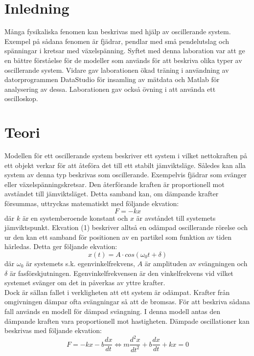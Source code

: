 \documentclass[a4paper,10pt]{article}
\begin{document}
\section{Inledning}
Många fysikaliska fenomen kan beskrivas med hjälp av oscillerande system. Exempel på sådana fenomen är fjädrar, pendlar med små pendelutslag och spänningar i kretsar med växelspänning. Syftet med denna laboration var att ge en bättre förståelse för de modeller som används för att beskriva olika typer av oscillerande system. Vidare gav laborationen ökad träning i användning av datorprogrammen DataStudio för insamling av mätdata och Matlab för analysering av dessa. Laborationen gav också övning i att använda ett oscilloskop.

\section{Teori}
 Modellen för ett oscillerande system beskriver ett system i vilket nettokraften på ett objekt verkar för att åteföra det till ett stabilt jämviktsläge. Således kan alla system av denna typ beskrivas som oscillerande. Exempelvis fjädrar som svänger eller växelspänningskretsar. Den återförande kraften är proportionell mot avståndet till jämviktsläget. Detta samband kan, om dämpande krafter försummas, uttryckas matematiskt med följande ekvation:
\begin{equation}
	F = -kx
\end{equation}
där $k$ är en systemberoende konstant och $x$ är avståndet till systemets jämviktspunkt. Ekvation (1) beskriver alltså en odämpad oscillerande rörelse och ur den kan ett samband för positionen av en partikel som funktion av tiden härledas. Detta ger följande ekvation:
\begin{equation}
	x(t) = A \cdot cos(\omega_0t + \delta)
\end{equation}
där $\omega_0$ är systemets s.k. egenvinkelfrekvens, $A$ är amplituden av svängningen och $\delta$ är fasförskjutningen. Egenvinkelfrekvensen är den vinkelfrekvens vid vilket systemet svänger om det in påverkas av yttre krafter.
\\
\indent Dock är sällan fallet i verkligheten att ett system är odämpat. Krafter från omgivningen dämpar ofta svängningar så att de bromsas. För att beskriva sådana fall används en modell för dämpad svängning. I denna modell antas den dämpande kraften vara proportionell mot hastigheten. Dämpade oscillationer kan beskrivas med följande ekvation:
\begin{equation}
	F = -kx - b\frac{dx}{dt} \Longleftrightarrow m\frac{d^2x}{dt^2} + b\frac{dx}{dt} + kx = 0
\end{equation}
\end{document}
